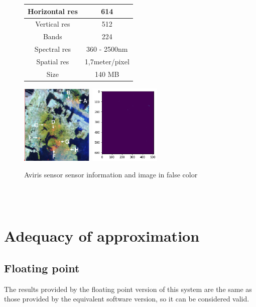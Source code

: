 \begin{figure}[!ht]
    \begin{tabular}[b]{c|c}\hline
      Horizontal res & 614 \\ \hline
      Vertical res & 512 \\ \hline
      Bands & 224 \\ \hline
      Spectral res & 360 - 2500nm \\ \hline
      Spatial res & 1,7meter/pixel \\ \hline
      Size & 140 MB\\ \hline
    \end{tabular}
\includegraphics[height=1.5in]{figures/wtc_bad.png}
\includegraphics[height=1.5in]{figures/wtc_rx.png}
    \caption{Aviris sensor sensor information and image in false color}
  \end{figure}
\\
\\
\section{Adequacy of approximation}
\subsection{Floating point}
The results provided by the floating point version of this system are the same as those provided by the equivalent software version, so it can be considered valid.

